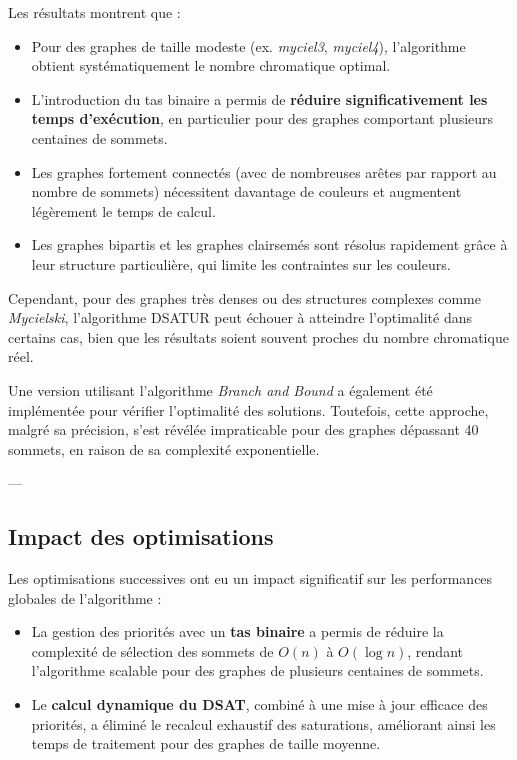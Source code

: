 \documentclass[11pt]{article}
\begin{document}
Les résultats montrent que :
\begin{itemize}
    \item Pour des graphes de taille modeste (ex. \textit{myciel3}, \textit{myciel4}), l’algorithme obtient systématiquement le nombre chromatique optimal.
    \item L’introduction du tas binaire a permis de \textbf{réduire significativement les temps d’exécution}, en particulier pour des graphes comportant plusieurs centaines de sommets.
    \item Les graphes fortement connectés (avec de nombreuses arêtes par rapport au nombre de sommets) nécessitent davantage de couleurs et augmentent légèrement le temps de calcul.
    \item Les graphes bipartis et les graphes clairsemés sont résolus rapidement grâce à leur structure particulière, qui limite les contraintes sur les couleurs.
\end{itemize}

Cependant, pour des graphes très denses ou des structures complexes comme \textit{Mycielski}, l’algorithme DSATUR peut échouer à atteindre l’optimalité dans certains cas, bien que les résultats soient souvent proches du nombre chromatique réel.

Une version utilisant l’algorithme \textit{Branch and Bound} a également été implémentée pour vérifier l'optimalité des solutions. Toutefois, cette approche, malgré sa précision, s’est révélée impraticable pour des graphes dépassant 40 sommets, en raison de sa complexité exponentielle.

---

\subsection{Impact des optimisations}

Les optimisations successives ont eu un impact significatif sur les performances globales de l’algorithme :
\begin{itemize}
    \item La gestion des priorités avec un \textbf{tas binaire} a permis de réduire la complexité de sélection des sommets de \( O(n) \) à \( O(\log n) \), rendant l’algorithme scalable pour des graphes de plusieurs centaines de sommets.
    \item Le \textbf{calcul dynamique du DSAT}, combiné à une mise à jour efficace des priorités, a éliminé le recalcul exhaustif des saturations, améliorant ainsi les temps de traitement pour des graphes de taille moyenne.
\end{itemize}
\end{document}

